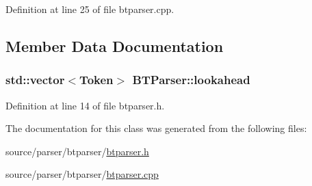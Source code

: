 Definition at line 25 of file btparser.cpp.



\subsection{Member Data Documentation}
\hypertarget{class_b_t_parser_a796693745ebe354914eeacddba20f109}{
\subsubsection[{lookahead}]{\setlength{\rightskip}{0pt plus 5cm}std::vector$<${\bf Token}$>$ {\bf BTParser::lookahead}}}
\label{class_b_t_parser_a796693745ebe354914eeacddba20f109}


Definition at line 14 of file btparser.h.



The documentation for this class was generated from the following files:\begin{DoxyCompactItemize}
\item 
source/parser/btparser/\hyperlink{btparser_8h}{btparser.h}\item 
source/parser/btparser/\hyperlink{btparser_8cpp}{btparser.cpp}\end{DoxyCompactItemize}
